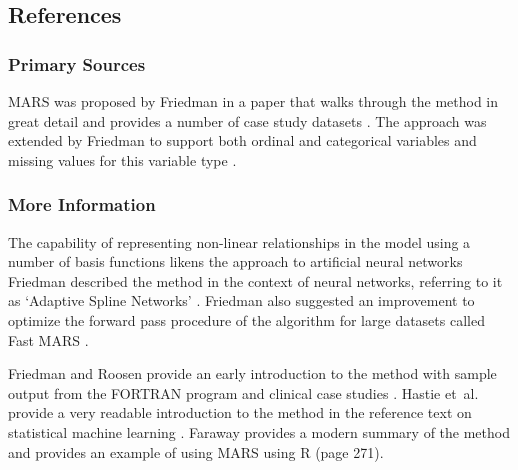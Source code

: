 \subsection{References}

\subsubsection{Primary Sources}
MARS was proposed by Friedman in a paper that walks through the method in great detail and provides a number of case study datasets \cite{Friedman1991}.
The approach was extended by Friedman to support both ordinal and categorical variables and missing values for this variable type \cite{Friedman1991a, Friedman1993a}.

\subsubsection{More Information}
The capability of representing non-linear relationships in the model using a number of basis functions likens the approach to artificial neural networks Friedman described the method in the context of neural networks, referring to it as `Adaptive Spline Networks' \cite{Friedman1991b, Friedman1991c}.
Friedman also suggested an improvement to optimize the forward pass procedure of the algorithm for large datasets called Fast MARS \cite{Friedman1993}.

Friedman and Roosen provide an early introduction to the method with sample output from the FORTRAN program and clinical case studies \cite{Friedman1995}. Hastie et~al. provide a very readable introduction to the method in the reference text on statistical machine learning \cite{Hastie2009}.
Faraway provides a modern summary of the method and provides an example of using MARS using R \cite{Faraway2006} (page 271).


